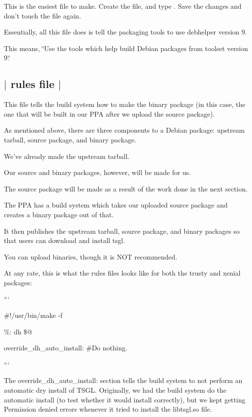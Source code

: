 This is the easiest file to make. Create the file, and type {}. Save the changes and don't touch the file again.

Essentially, all this file does is tell the packaging tools to use {\ttfamily debhelper} version 9.

This means, \char`\"{}\-Use the tools which help build Debian packages from toolset version 9.\char`\"{} 

 \subsection*{$\vert$ {\ttfamily rules} file $\vert$ }

This file tells the build system how to make the binary package (in this case, the one that will be built in our P\-P\-A after we upload the source package).

As mentioned above, there are three components to a Debian package\-: upstream tarball, source package, and binary package.

We've already made the upstream tarball.

Our source and binary packages, however, will be made for us.

The source package will be made as a result of the work done in the next section.

The P\-P\-A has a build system which takes our uploaded source package and creates a binary package out of that.

It then publishes the upstream tarball, source package, and binary packages so that users can download and install tsgl.

You can upload binaries, though it is N\-O\-T recommended.

At any rate, this is what the {\ttfamily rules} files looks like for both the {\ttfamily trusty} and {\ttfamily xenial} packages\-:

```

\#!/usr/bin/make -\/f

\%\-: dh \$@

override\-\_\-dh\-\_\-auto\-\_\-install\-: \#\-Do nothing.

```

The {\ttfamily override\-\_\-dh\-\_\-auto\-\_\-install\-:} section tells the build system to not perform an automatic dry install of T\-S\-G\-L. Originally, we had the build system do the automatic install (to test whether it would install correctly), but we kept getting {\ttfamily Permission denied} errors whenever it tried to install the {\ttfamily libtsgl.\-so} file.

